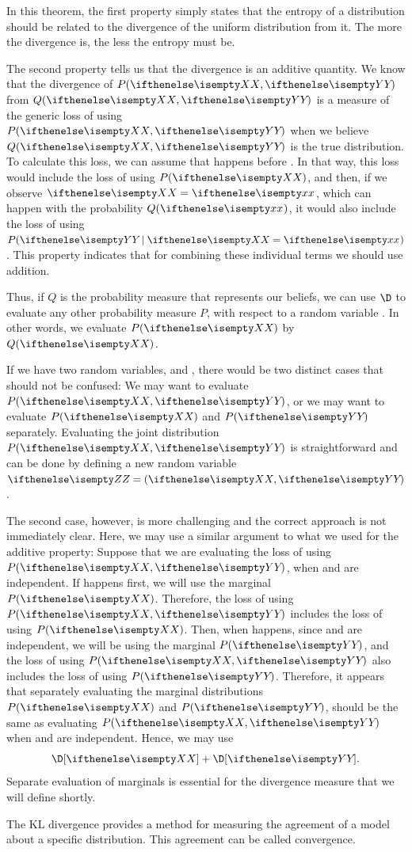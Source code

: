 In this theorem, the first property simply states that the entropy of a distribution should be related to the
divergence of the uniform distribution from it.
The more the divergence is, the less the entropy must be.

The second property tells us that the divergence is an additive quantity.
We know that the divergence of $P(\XY)$ from $Q(\XY)$ is a measure of the generic loss of using $P(\XY)$
when we believe $Q(\XY)$ is the true distribution.
To calculate this loss, we can assume that \X happens before \Y.
In that way, this loss would include the loss of using $P(\X)$, and then, if we observe
$\assign{X}$, which can happen with the probability $Q(\x)$, it would also include the loss of
using $P(\Y \mid \assign{x})$.
This property indicates that for combining these individual terms we should use addition.

Thus, if $Q$ is the probability measure that represents our beliefs, we can use $\D$ to evaluate any other
probability measure $P$, with respect to a random variable \X.
In other words, we evaluate $P(\X)$ by $Q(\X)$.

If we have two random variables, \X and \Y, there would be two distinct cases that should not be
confused:
We may want to evaluate $P(\XY)$, or we may want to evaluate $P(\X)$ and $P(\Y)$ separately.
Evaluating the joint distribution $P(\XY)$ is straightforward and can be done by defining a new random variable
$\rv{Z} = (\XY)$.

The second case, however, is more challenging and the correct approach is not immediately clear.
Here, we may use a similar argument to what we used for the additive property:
Suppose that we are evaluating the loss of using $P(\XY)$, when \X and \Y are independent.
If \X happens first, we will use the marginal $P(\X)$.
Therefore, the loss of using $P(\XY)$ includes the loss of using $P(\X)$.
Then, when \Y happens, since \X and \Y are independent, we will be using the marginal $P(\Y)$,
and the loss of using $P(\XY)$ also includes the loss of using $P(\Y)$.
Therefore, it appears that separately evaluating the marginal distributions $P(\X)$ and $P(\Y)$, should be the same as
evaluating $P(\XY)$ when \X and \Y are independent.
Hence, we may use
\[
    \D[\X] + \D[\Y].
\]
Separate evaluation of marginals is essential for the divergence measure that we will define shortly.

The KL divergence provides a method for measuring the agreement of a model about a specific distribution.
This agreement can be called convergence.

